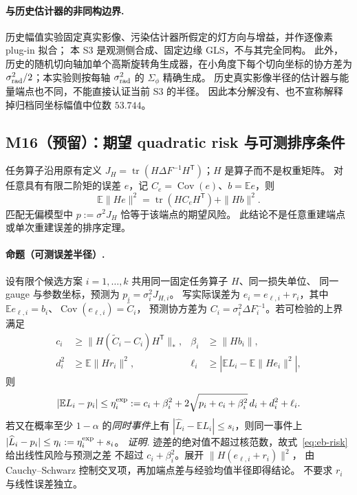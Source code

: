 \paragraph{与历史估计器的非同构边界.}
历史幅值实验固定真实影像、污染估计器所假定的灯方向与增益，并作逐像素 plug-in 拟合；
本 S3 是观测侧合成、固定边缘 GLS，不与其完全同构。
此外，历史的随机切向轴加单个高斯旋转角生成器，在小角度下每个切向坐标的协方差为
$\sigma_{\rm rad}^2/2$；本实验则按每轴 $\sigma_{\rm rad}^2$ 的 $\Sigma_\phi$ 精确生成。
历史真实影像半径的估计器与能量端点也不同，不能直接认证当前 S3 的半径。
因此本分解没有、也不宣称解释掉归档同坐标幅值中位数 $53.744$。

\subsection{M16（预留）：期望 quadratic risk 与可测排序条件}
任务算子沿用原有定义
$J_H=\operatorname{tr}(H\Delta F^{-1}H^{\mathsf T})$；$H$ 是算子而不是权重矩阵。
对任意具有有限二阶矩的误差 $e$，记 $C_e=\operatorname{Cov}(e)$、$b=\mathbb E e$，则
\begin{equation}
 \mathbb E\|He\|^2=\operatorname{tr}(HC_eH^{\mathsf T})+\|Hb\|^2.
 \label{eq:eb-risk}
\end{equation}
匹配无偏模型中 $p:=\sigma^2J_H$ 恰等于该端点的期望风险。
此结论不是任意重建端点或单次重建误差的排序定理。

\paragraph{命题（可测误差半径）.}
设有限个候选方案 $i=1,\ldots,k$ 共用同一固定任务算子 $H$、同一损失单位、
同一 gauge 与参数坐标，预测为 $p_i=\sigma_i^2J_{H,i}$。
写实际误差为 $e_i=e_{\ell,i}+r_i$，其中
$\mathbb E e_{\ell,i}=b_i$、$\operatorname{Cov}(e_{\ell,i})=\widetilde C_i$，
预测协方差为 $C_i=\sigma_i^2\Delta F_i^{-1}$。若可检验的上界满足
\begin{align}
 c_i&\ge\|H(\widetilde C_i-C_i)H^{\mathsf T}\|_*,&
 \beta_i&\ge\|Hb_i\|,\\
 d_i^2&\ge\mathbb E\|Hr_i\|^2,&
 \ell_i&\ge\left|\mathbb E L_i-\mathbb E\|He_i\|^2\right|,
\end{align}
则
\begin{equation}
 |\mathbb E L_i-p_i|\le
 \eta_i^{\rm exp}:=c_i+\beta_i^2+
 2\sqrt{p_i+c_i+\beta_i^2}\,d_i+d_i^2+\ell_i.
 \label{eq:eb-radius}
\end{equation}
若又在概率至少 $1-\alpha$ 的\emph{同时事件}上有
$|\widehat L_i-\mathbb E L_i|\le s_i$，则同一事件上
$|\widehat L_i-p_i|\le\eta_i:=\eta_i^{\rm exp}+s_i$。
\emph{证明.}
迹差的绝对值不超过核范数，故式~\eqref{eq:eb-risk} 给出线性风险与预测之差
不超过 $c_i+\beta_i^2$。展开 $\|H(e_{\ell,i}+r_i)\|^2$，
由 Cauchy--Schwarz 控制交叉项，再加端点差与经验均值半径即得结论。
不要求 $r_i$ 与线性误差独立。


